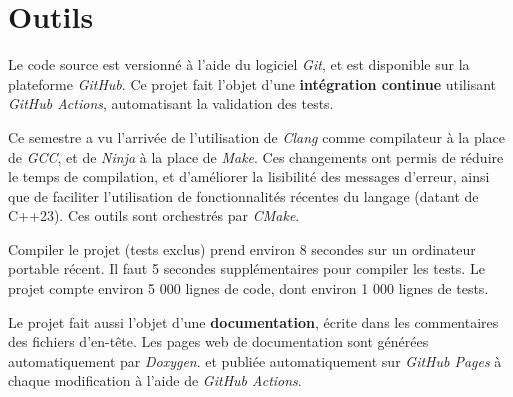 \section{Outils}

Le code source est versionné à l'aide du logiciel \textit{Git}, et est disponible sur la plateforme \textit{GitHub}. \cite{Git} \cite{GitHub} \cite{Leroy_2025} Ce projet fait l'objet d'une \textbf{intégration continue} utilisant \textit{GitHub Actions}, automatisant la validation des tests.

Ce semestre a vu l'arrivée de l'utilisation de \textit{Clang} comme compilateur à la place de \textit{GCC}, et de \textit{Ninja} à la place de \textit{Make}. \cite{Clang} \cite{Ninja}
Ces changements ont permis de réduire le temps de compilation, et d'améliorer la lisibilité des messages d'erreur, ainsi que de faciliter l'utilisation de fonctionnalités récentes du langage (datant de C++23).
Ces outils sont orchestrés par \textit{CMake}. \cite{CMake}

Compiler le projet (tests exclus) prend environ 8 secondes sur un ordinateur portable récent. Il faut 5 secondes supplémentaires pour compiler les tests. Le projet compte environ 5 000 lignes de code, dont environ 1 000 lignes de tests.

Le projet fait aussi l'objet d'une \textbf{documentation}, écrite dans les commentaires des fichiers d'en-tête. Les pages web de documentation sont générées automatiquement par \textit{Doxygen}. \cite{Doxygen} et publiée automatiquement sur \textit{GitHub Pages} à chaque modification à l'aide de \textit{GitHub Actions}. \cite{Leroy_doc}